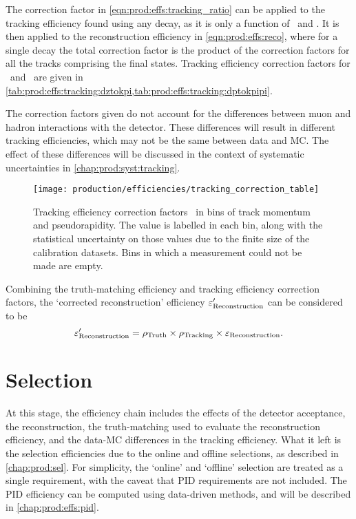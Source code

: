 The correction factor in \cref{eqn:prod:effs:tracking_ratio} can be applied to
the tracking efficiency found using any decay, as it is only a function of
\ptot\ and \Eta.
It is then applied to the reconstruction efficiency in
\cref{eqn:prod:effs:reco}, where for a single decay the total correction factor
is the product of the correction factors for all the tracks comprising the
final states.
Tracking efficiency correction factors for \DzToKpi\ and \DpToKpipi\ are given
in \cref{tab:prod:effs:tracking:dztokpi,tab:prod:effs:tracking:dptokpipi}.

The correction factors given do not account for the differences between muon
and hadron interactions with the detector.
These differences will result in different tracking efficiencies, which may not
be the same between data and \ac{MC}.
The effect of these differences will be discussed in the context of systematic
uncertainties in \cref{chap:prod:syst:tracking}.

\begin{figure}
  \centering
  \texttt{[image: production/efficiencies/tracking\_correction\_table]}
  \caption{%
    Tracking efficiency correction factors \efftracking\ in bins of track
    momentum and pseudorapidity.
    The value is labelled in each bin, along with the statistical uncertainty
    on those values due to the finite size of the calibration datasets.
    Bins in which a measurement could not be made are empty.
  }
  \label{fig:prod:effs:tracking_table}
\end{figure}

Combining the truth-matching efficiency and tracking efficiency correction
factors, the `corrected reconstruction' efficiency $\varepsilon_{\textnormal{Reconstruction}}'$ can be
considered to be
\begin{equation}
  \varepsilon_{\textnormal{Reconstruction}}' = \rho_{\textnormal{Truth}}\times\rho_{\textnormal{Tracking}}\times\varepsilon_{\textnormal{Reconstruction}}.
  \label{eqn:prod:effs:reco_corrected}
\end{equation}

\section{Selection}
\label{chap:prod:effs:sel}

At this stage, the efficiency chain includes the effects of the detector
acceptance, the reconstruction, the truth-matching used to evaluate the
reconstruction efficiency, and the data-\ac{MC} differences in the tracking
efficiency.
What it left is the selection efficiencies due to the online and offline
selections, as described in \cref{chap:prod:sel}.
For simplicity, the `online' and `offline' selection are treated as a single
requirement, with the caveat that \ac{PID} requirements are not included.
The \ac{PID} efficiency can be computed using data-driven methods, and will be
described in \cref{chap:prod:effs:pid}.

